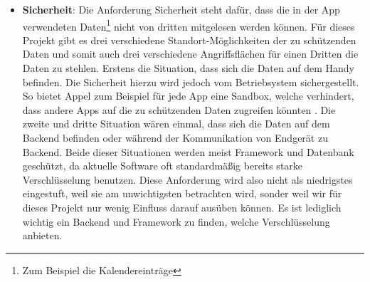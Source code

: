 \begin{itemize}
	\item \textbf{Sicherheit}: Die Anforderung Sicherheit steht dafür, dass die in der App verwendeten Daten\footnote{Zum Beispiel die Kalendereinträge} nicht von dritten mitgelesen werden können. \newline%
	Für dieses Projekt gibt es drei verschiedene Standort-Möglichkeiten der zu schützenden Daten und somit auch drei verschiedene Angriffsflächen für einen Dritten die Daten zu stehlen.\newline%
	Erstens die Situation, dass sich die Daten auf dem Handy befinden. Die Sicherheit hierzu wird jedoch vom Betriebsystem sichergestellt. So bietet Appel zum Beispiel für jede App eine Sandbox, welche verhindert, dass andere Apps auf die zu schützenden Daten zugreifen könnten \cite{nfA_sandbox}.\newline%
	Die zweite und dritte Situation wären einmal, dass sich die Daten auf dem Backend befinden oder während der Kommunikation von Endgerät zu Backend. Beide dieser Situationen werden meist Framework und Datenbank geschützt, da aktuelle Software oft standardmäßig bereits starke Verschlüsselung benutzen. \newline%
	Diese Anforderung wird also nicht als niedrigstes eingestuft, weil sie am unwichtigsten betrachten wird, sonder weil wir für dieses Projekt nur wenig Einfluss darauf ausüben können. Es ist lediglich wichtig ein Backend und Framework zu finden, welche Verschlüsselung anbieten.

\end{itemize}